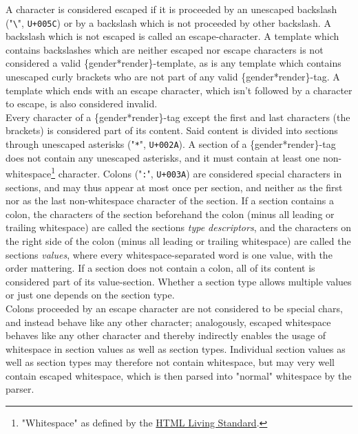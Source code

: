 \documentclass{article}
\begin{document}
    A character is considered escaped if it is proceeded by an unescaped backslash ("\texttt{\textbackslash}", \texttt{U+005C}) or by a backslash which is not proceeded by other backslash.
    A backslash which is not escaped is called an escape-character.
    A template which contains backslashes which are neither escaped nor escape characters is not considered a valid \{gender*render\}-template, as is any template which contains unescaped curly brackets who are not part of any valid \{gender*render\}-tag.
    A template which ends with an escape character, which isn't followed by a character to escape, is also considered invalid.\\

    Every character of a \{gender*render\}-tag except the first and last characters (the brackets) is considered part of its content.
    Said content is divided into sections through unescaped asterisks ("\texttt{*}", \texttt{U+002A}).
    A section of a \{gender*render\}-tag does not contain any unescaped asterisks, and it must contain at least one non-whitespace\footnote{"Whitespace" as defined by the \href{https://infra.spec.whatwg.org/\#ascii-whitespace}{HTML Living Standard}.} character.
    Colons ("\texttt{:}", \texttt{U+003A}) are considered special characters in sections, and may thus appear at most once per section, and neither as the first nor as the last non-whitespace  character of the section.
    If a section contains a colon, the characters of the section beforehand the colon (minus all leading or trailing whitespace) are called the sections \emph{type descriptors}, and the characters on the right side of the colon (minus all leading or trailing whitespace) are called the sections \emph{values},
    where every whitespace-separated word is one value, with the order mattering.
    If a section does not contain a colon, all of its content is considered part of its value-section.
    Whether a section type allows multiple values or just one depends on the section type.\\

    Colons proceeded by an escape character are not considered to be special chars, and instead behave like any other character;
    analogously, escaped whitespace behaves like any other character and thereby indirectly enables the usage of whitespace in section values as well as section types.
    Individual section values as well as section types may therefore not contain whitespace, but may very well contain escaped whitespace, which is then parsed into "normal" whitespace by the parser.\\
\end{document}
